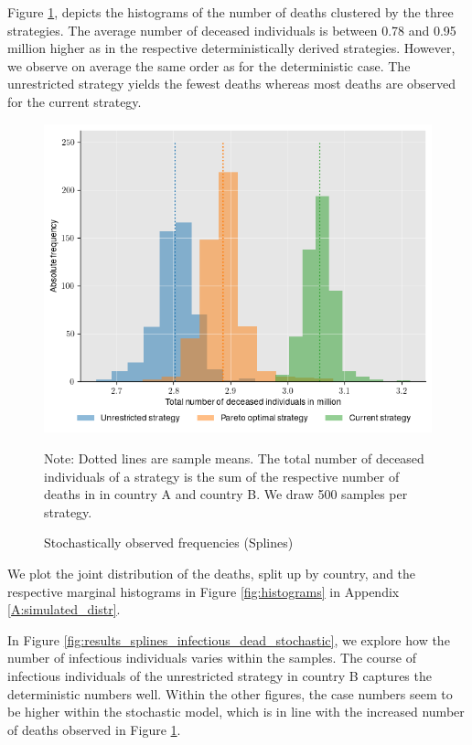 Figure \ref{fig:results_splines_stochastic_histogram}, depicts the histograms of the number of deaths clustered by the three strategies. The average number of deceased individuals is between 0.78 and 0.95 million higher as in the respective deterministically derived strategies. However, we observe on average the same order as for the deterministic case. The unrestricted strategy yields the fewest deaths whereas most deaths are observed for the current strategy. 
\begin{figure}[h!]
\centering
\includegraphics[scale=0.65]{images/splines_stochastic_histogram.png}\\
\begin{flushleft}
\scriptsize{Note:} Dotted lines are sample means. The total number of deceased individuals of a strategy is the sum of the respective number of deaths in in country A and country B. We draw 500 samples per strategy. 
\end{flushleft}
\caption{Stochastically observed frequencies (Splines)}
\label{fig:results_splines_stochastic_histogram}
\end{figure}
We plot the joint distribution of the deaths, split up by country, and the respective marginal histograms in Figure \ref{fig:histograms} in Appendix \ref{A:simulated_distr}.

In Figure \ref{fig:results_splines_infectious_dead_stochastic}, we explore how the number of infectious individuals varies within the samples. The course of infectious individuals of the unrestricted strategy in country B captures the deterministic numbers well. Within the other figures, the case numbers seem to be higher within the stochastic model, which is in line with the increased number of deaths observed in Figure \ref{fig:results_splines_stochastic_histogram}.

